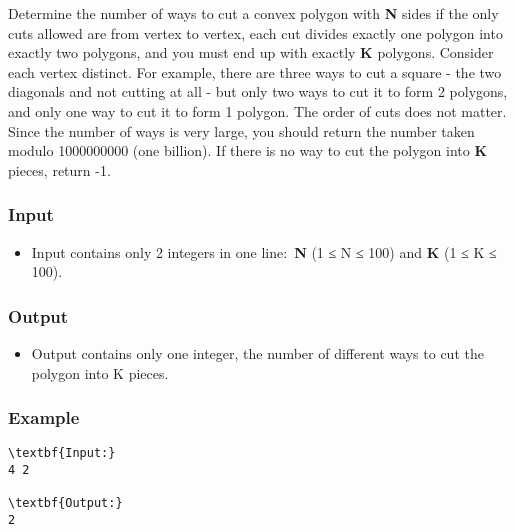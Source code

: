 

Determine the number of ways to cut a convex polygon with \textbf{N} sides if the only cuts allowed are from vertex to vertex, each cut divides exactly one polygon into exactly two polygons, and you must end up with exactly \textbf{K} polygons. Consider each vertex distinct. For example, there are three ways to cut a square - the two diagonals and not cutting at all - but only two ways to cut it to form 2 polygons, and only one way to cut it to form 1 polygon. The order of cuts does not matter. Since the number of ways is very large, you should return the number taken modulo 1000000000 (one billion). If there is no way to cut the polygon into \textbf{K} pieces, return -1.    

\subsubsection{Input}
\begin{itemize}
	\item Input contains only 2 integers in one line: \textbf{N} (1 ≤ N ≤ 100) and \textbf{K} (1 ≤ K ≤ 100).
\end{itemize}

\subsubsection{Output}
\begin{itemize}
	\item Output contains only one integer, the number of different ways to cut the polygon into K pieces.
\end{itemize}

\subsubsection{Example}
\begin{verbatim}
\textbf{Input:}
4 2

\textbf{Output:}
2
\end{verbatim}
